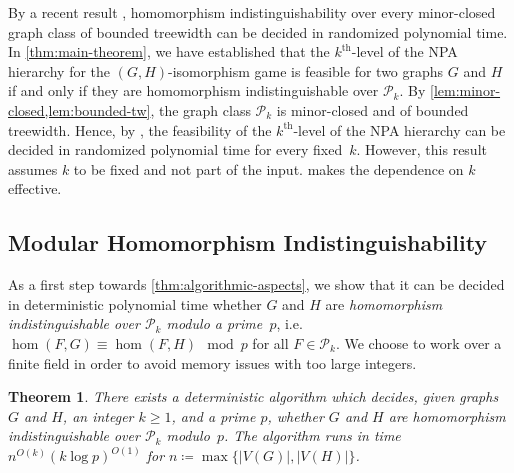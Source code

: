 \documentclass[a4paper,onecolumn,11pt,accepted=2026-01-06]{quantumarticle}
\theoremstyle{plain}
\newtheorem{thm}{Theorem}[section]
\theoremstyle{remark}
\theoremstyle{definition}
\begin{document}
By a recent result \cite[Theorem~1.1]{seppelt_algorithmic_2024},
homomorphism indistinguishability over every minor-closed graph class of bounded treewidth can be decided in randomized polynomial time.
In \cref{thm:main-theorem}, we have established that the $k^{\text{th}}$-level of the NPA hierarchy for the $(G,H)$-isomorphism game is feasible for two graphs $G$ and $H$ if and only if 
they are homomorphism indistinguishable over $\mathcal{P}_k$.
By \cref{lem:minor-closed,lem:bounded-tw},
the graph class $\mathcal{P}_k$ is minor-closed and of bounded treewidth. 
Hence, by \cite[Theorem~1.1]{seppelt_algorithmic_2024}, 
the feasibility of the $k^{\text{th}}$-level of the NPA hierarchy can be decided in randomized polynomial time for every fixed~$k$.
However, this result assumes $k$ to be fixed and not part of the input.
 makes the dependence on $k$ effective.

\subsection{Modular Homomorphism Indistinguishability}
\label{sec:mod-hom}
As a first step towards \cref{thm:algorithmic-aspects}, we show that it can be decided in deterministic polynomial time whether $G$ and $H$ are \emph{homomorphism indistinguishable over $\mathcal{P}_k$ modulo a prime~$p$}, i.e.\ $\hom(F, G) \equiv \hom(F, H) \mod p$ for all $F \in \mathcal{P}_k$. 
We choose to work over a finite field in order to avoid memory issues with too large integers.


\begin{thm}\label{thm:algorithmic-aspects-prime}
    There exists a deterministic algorithm which decides, given graphs $G$ and $H$, an integer $k\geq 1$, and a prime $p$,
    whether $G$ and $H$ are homomorphism indistinguishable over $\mathcal{P}_k$ modulo~$p$.
    The algorithm runs in time $n^{O(k)} (k \log p)^{O(1)}$ for $n \coloneqq \max \{\lvert V(G) \rvert , \lvert V(H) \rvert  \}$.
\end{thm}
\end{document}
